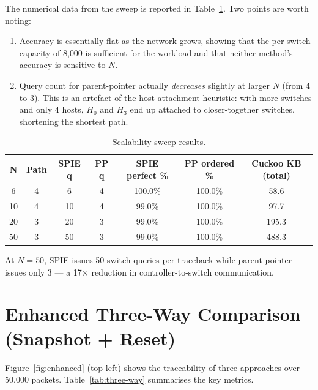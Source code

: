 \documentclass[12pt, a4paper]{report}
\begin{document}
The numerical data from the sweep is reported in
Table~\ref{tab:scalability}. Two points are worth noting:

\begin{enumerate}[leftmargin=*]
  \item Accuracy is essentially flat as the network grows, showing that
  the per-switch capacity of 8{,}000 is sufficient for the workload and
  that neither method's accuracy is sensitive to $N$.
  \item Query count for parent-pointer actually \textit{decreases}
  slightly at larger $N$ (from 4 to 3). This is an artefact of the
  host-attachment heuristic: with more switches and only 4 hosts, $H_0$
  and $H_3$ end up attached to closer-together switches, shortening the
  shortest path.
\end{enumerate}

\begin{table}[H]
\centering
\caption{Scalability sweep results.}
\label{tab:scalability}
\begin{tabular}{ccccccc}
\toprule
\textbf{N} & \textbf{Path} & \textbf{SPIE q} & \textbf{PP q}
           & \textbf{SPIE perfect \%} & \textbf{PP ordered \%}
           & \textbf{Cuckoo KB (total)} \\
\midrule
 6 & 4 &  6 & 4 & 100.0\% & 100.0\% &  58.6 \\
10 & 4 & 10 & 4 &  99.0\% & 100.0\% &  97.7 \\
20 & 3 & 20 & 3 &  99.0\% & 100.0\% & 195.3 \\
50 & 3 & 50 & 3 &  99.0\% & 100.0\% & 488.3 \\
\bottomrule
\end{tabular}
\end{table}

At $N=50$, SPIE issues 50 switch queries per traceback while
parent-pointer issues only 3 --- a 17$\times$ reduction in
controller-to-switch communication.

\section{Enhanced Three-Way Comparison (Snapshot + Reset)}
\label{sec:three-way}

Figure~\ref{fig:enhanced} (top-left) shows the traceability of three
approaches over 50{,}000 packets. Table~\ref{tab:three-way} summarises
the key metrics.
\end{document}

